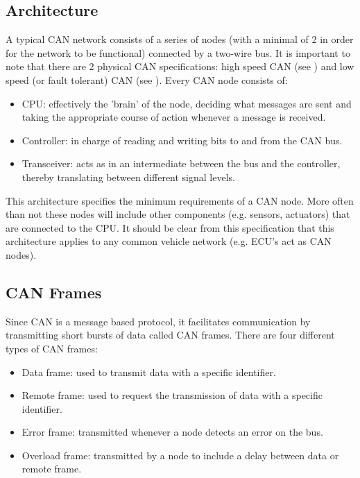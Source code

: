 \subsection{Architecture}
\label{subsec:can:architecture}

A typical CAN network consists of a series of nodes (with a minimal of 2 in order for the network to be functional) connected by a two-wire bus. It is important to note that there are 2 physical CAN specifications: high speed CAN (see \cite{ISO11898-2}) and low speed (or fault tolerant) CAN (see \cite{ISO11898-3}). Every CAN node consists of:
\begin{itemize}
	\item CPU: effectively the 'brain' of the node, deciding what messages are sent and taking the appropriate course of action whenever a message is received.
	\item Controller: in charge of reading and writing bits to and from the CAN bus.
	\item Transceiver: acts as in an intermediate between the bus and the controller, thereby translating between different signal levels.
\end{itemize}

This architecture specifies the minimum requirements of a CAN node. More often than not these nodes will include other components (e.g. sensors, actuators) that are connected to the CPU. It should be clear from this specification that this architecture applies to any common vehicle network (e.g. ECU's act as CAN nodes).

\subsection{CAN Frames}
\label{subsec:can:frames}

Since CAN is a message based protocol, it facilitates communication by transmitting short bursts of data called CAN frames. There are four different types of CAN frames:
\begin{itemize}
	\item Data frame: used to transmit data with a specific identifier.
	\item Remote frame: used to request the transmission of data with a specific identifier.
	\item Error frame: transmitted whenever a node detects an error on the bus.
	\item Overload frame: transmitted by a node to include a delay between data or remote frame.
\end{itemize}

